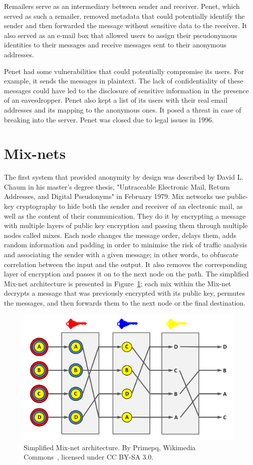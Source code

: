 Remailers serve as an intermediary between sender and receiver. Penet, which served as such a remailer, removed metadata that could potentially identify the sender and then forwarded the message without sensitive data to the receiver. It also served as an e-mail box that allowed users to assign their pseudonymous identities to their messages and receive messages sent to their anonymous addresses.

Penet had some vulnerabilities that could potentially compromise its users. For example, it sends the messages in plaintext. The lack of confidentiality of these messages could have led to the disclosure of sensitive information in the presence of an eavesdropper. Penet also kept a list of its users with their real email addresses and its mapping to the anonymous ones. It posed a threat in case of breaking into the server.
Penet was closed due to legal issues in 1996.

\section{Mix-nets}

The first system that provided anonymity by design was described by David L. Chaum in his master's degree thesis, "Untraceable Electronic Mail, Return Addresses, and Digital Pseudonyms" in February 1979. Mix networks use public-key cryptography to hide both the sender and receiver of an electronic mail, as well as the content of their communication. They do it by encrypting a message with multiple layers of public key encryption and passing them through multiple nodes called mixes. Each node changes the message order, delays them, adds random information and padding in order to minimise the risk of traffic analysis and associating the sender with a given message; in other words, to obfuscate correlation between the input and the output. It also removes the corresponding layer of encryption and passes it on to the next node on the path. The simplified Mix-net architecture is presented in Figure~\ref{fig:mixnet}; each mix within the Mix-net decrypts a message that was previously encrypted with its public key, permutes the messages, and then forwards them to the next node or the final destination.

\begin{figure}[ht]
  \centering
  \includegraphics[width=0.7\linewidth]{Images/mix-net.png}
  \caption{Simplified Mix-net architecture. By Primepq, Wikimedia Commons~\cite{primepq_mixnet_2008}, licensed under CC BY-SA 3.0.}
  \label{fig:mixnet}
\end{figure}


